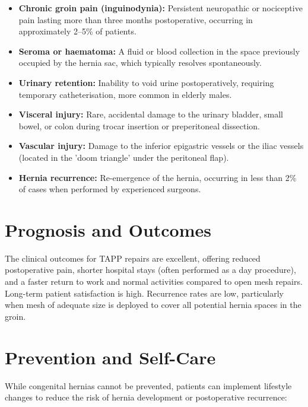 \begin{itemize}
    \item \textbf{Chronic groin pain (inguinodynia):} Persistent neuropathic or nociceptive pain lasting more than three months postoperative, occurring in approximately 2--5\% of patients.
    \item \textbf{Seroma or haematoma:} A fluid or blood collection in the space previously occupied by the hernia sac, which typically resolves spontaneously.
    \item \textbf{Urinary retention:} Inability to void urine postoperatively, requiring temporary catheterisation, more common in elderly males.
    \item \textbf{Visceral injury:} Rare, accidental damage to the urinary bladder, small bowel, or colon during trocar insertion or preperitoneal dissection.
    \item \textbf{Vascular injury:} Damage to the inferior epigastric vessels or the iliac vessels (located in the 'doom triangle' under the peritoneal flap).
    \item \textbf{Hernia recurrence:} Re-emergence of the hernia, occurring in less than 2\% of cases when performed by experienced surgeons.
\end{itemize}

\section*{Prognosis and Outcomes}
The clinical outcomes for TAPP repairs are excellent, offering reduced postoperative pain, shorter hospital stays (often performed as a day procedure), and a faster return to work and normal activities compared to open mesh repairs. Long-term patient satisfaction is high. Recurrence rates are low, particularly when mesh of adequate size is deployed to cover all potential hernia spaces in the groin.

\section*{Prevention and Self-Care}
While congenital hernias cannot be prevented, patients can implement lifestyle changes to reduce the risk of hernia development or postoperative recurrence:


